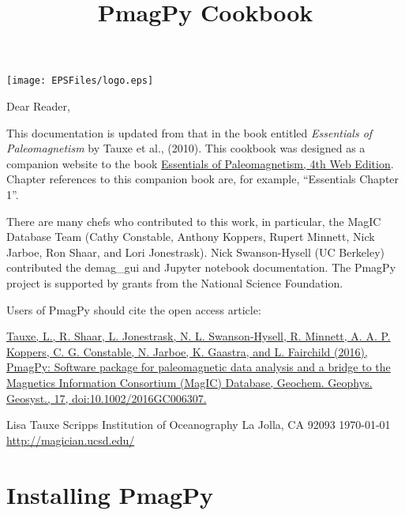\documentclass[11pt]{book}
\begin{document}
 \setcounter{tocdepth}{3}
\tableofcontents


{\hskip 1in \texttt{[image: EPSFiles/logo.eps]}

 \title{PmagPy Cookbook}

 \maketitle
\noindent Dear Reader,

This documentation is updated from that in the book entitled {\it Essentials of Paleomagnetism} by  Tauxe et al., (2010). \nocite{tauxe10}  This cookbook was designed as a companion website to the book \href{http://earthref.org/MAGIC/books/Tauxe/Essentials/WebBook3.html}{Essentials of Paleomagnetism, 4th Web Edition}. Chapter references to this companion book are, for example, ``Essentials Chapter 1''.

There are many chefs who contributed to this work, in particular, the MagIC Database Team (Cathy Constable, Anthony Koppers, Rupert Minnett, Nick Jarboe, Ron Shaar, and Lori Jonestrask). Nick Swanson-Hysell (UC Berkeley) contributed the demag\_gui and Jupyter notebook documentation. The PmagPy project is supported by grants from the National Science Foundation.


Users of PmagPy should cite the open access article:

  \href{http://dx.doi.org/10.1002/2016GC006307}{Tauxe, L., R. Shaar, L. Jonestrask,
N. L. Swanson-Hysell, R. Minnett,
A. A. P. Koppers, C. G. Constable,
N. Jarboe, K. Gaastra, and L. Fairchild
(2016), PmagPy: Software package for
paleomagnetic data analysis and a
bridge to the Magnetics Information
Consortium (MagIC) Database,
Geochem. Geophys. Geosyst., 17,
doi:10.1002/2016GC006307.}

{\obeylines
 Lisa Tauxe
 Scripps Institution of Oceanography
 La Jolla, CA 92093
 \today
  \url{http://magician.ucsd.edu/}
 }



\chapter{Installing {\bf PmagPy}}

}
\end{document}
